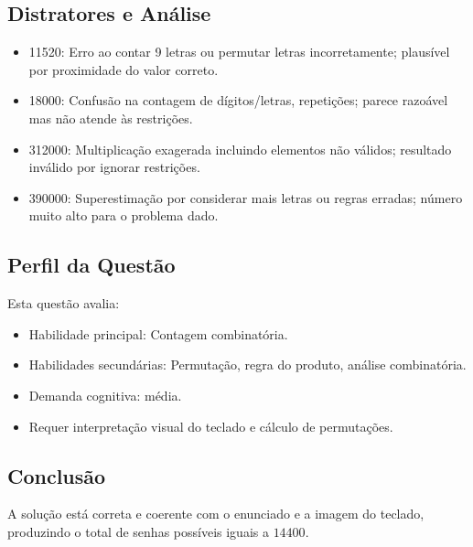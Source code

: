 \documentclass{article}
\begin{document}
\subsection*{Distratores e Análise}
\begin{itemize}
  \item 11520: Erro ao contar 9 letras ou permutar letras incorretamente; plausível por proximidade do valor correto.
  \item 18000: Confusão na contagem de dígitos/letras, repetições; parece razoável mas não atende às restrições.
  \item 312000: Multiplicação exagerada incluindo elementos não válidos; resultado inválido por ignorar restrições.
  \item 390000: Superestimação por considerar mais letras ou regras erradas; número muito alto para o problema dado.
\end{itemize}

\subsection*{Perfil da Questão}

Esta questão avalia:
\begin{itemize}
  \item Habilidade principal: Contagem combinatória.
  \item Habilidades secundárias: Permutação, regra do produto, análise combinatória.
  \item Demanda cognitiva: média.
  \item Requer interpretação visual do teclado e cálculo de permutações.
\end{itemize}

\subsection*{Conclusão}
A solução está correta e coerente com o enunciado e a imagem do teclado, produzindo o total de senhas possíveis iguais a $\boxed{14400}$.
\end{document}
